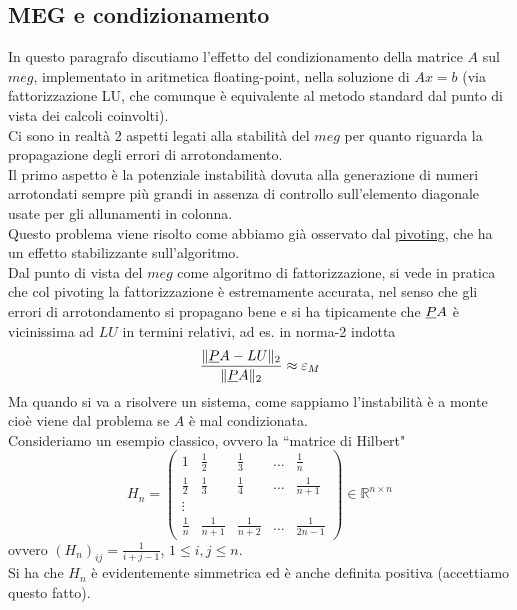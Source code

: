 \documentclass[12pt,a4paper]{article}
\DeclarePairedDelimiter{\norma}{\lVert}{\rVert}
\begin{document}
\subsection{MEG e condizionamento}
In questo paragrafo discutiamo l'effetto del condizionamento della matrice $A$ sul $meg$, implementato in aritmetica floating-point, nella soluzione di $Ax=b$ (via fattorizzazione LU, che comunque è equivalente al metodo standard dal punto di vista dei calcoli coinvolti). \\
Ci sono in realtà 2 aspetti legati alla stabilità del $meg$ per quanto riguarda la propagazione degli errori di arrotondamento.\\
Il primo aspetto è la potenziale instabilità dovuta alla generazione di numeri arrotondati sempre più grandi in assenza di controllo sull'elemento diagonale usate per gli allunamenti in colonna. \\
Questo problema viene risolto come abbiamo già osservato dal \uline{pivoting}, che ha un effetto stabilizzante sull'algoritmo. \\
Dal punto di vista del $meg$ come algoritmo di fattorizzazione, si vede in pratica che col pivoting la fattorizzazione è estremamente accurata, nel senso che gli errori di arrotondamento si propagano bene e si ha tipicamente che $\uline{P}A$ è vicinissima ad $LU$ in termini relativi, ad es. in norma-2 indotta
\begin{equation*}
    \frac{\norma{\uline{P}A-LU}_2}{\norma{\uline{P}A}_2} \approx \varepsilon_M
\end{equation*}
Ma quando si va a risolvere un sistema, come sappiamo l'instabilità è a monte cioè viene dal problema se $A$ è mal condizionata.\\
Consideriamo un esempio classico, ovvero la ``matrice di Hilbert"
\begin{equation*}
    H_n=\begin{pmatrix}
        1 & \frac{1}{2} & \frac{1}{3} & \dots & \frac{1}{n} \\ 
        \frac{1}{2} & \frac{1}{3} & \frac{1}{4} & \dots & \frac{1}{n+1} \\ 
        \vdots &  &  &  &  \\ 
        \frac{1}{n} & \frac{1}{n+1} & \frac{1}{n+2} & \dots & \frac{1}{2n-1}
    \end{pmatrix} \in \mathbb{R}^{n \times n}
\end{equation*}
ovvero $(H_n)_{ij} = \frac{1}{i+j-1}$, $1\leq i,j \leq n$. \\
Si ha che $H_n$ è evidentemente simmetrica ed è anche definita positiva (accettiamo questo fatto). \\
\end{document}
